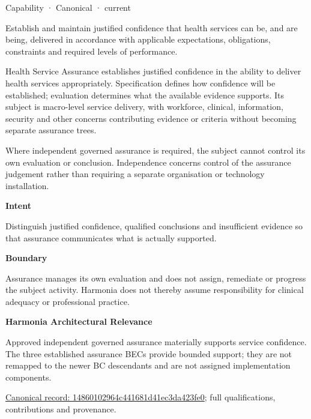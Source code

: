 \label{element:14860102964c441681d41ec3da423fe0}
{\small Capability · Canonical · current}\par

Establish and maintain justified confidence that health services can be, and are being, delivered in accordance with applicable expectations, obligations, constraints and required levels of performance.



Health Service Assurance establishes justified confidence in the ability to deliver health services appropriately. Specification defines how confidence will be established; evaluation determines what the available evidence supports. Its subject is macro-level service delivery, with workforce, clinical, information, security and other concerns contributing evidence or criteria without becoming separate assurance trees.



Where independent governed assurance is required, the subject cannot control its own evaluation or conclusion. Independence concerns control of the assurance judgement rather than requiring a separate organisation or technology installation.



\textbf{Intent}



Distinguish justified confidence, qualified conclusions and insufficient evidence so that assurance communicates what is actually supported.



\textbf{Boundary}



Assurance manages its own evaluation and does not assign, remediate or progress the subject activity. Harmonia does not thereby assume responsibility for clinical adequacy or professional practice.



\textbf{Harmonia Architectural Relevance}



Approved independent governed assurance materially supports service confidence. The three established assurance BECs provide bounded support; they are not remapped to the newer BC descendants and are not assigned implementation components.


{\footnotesize \href{../../../../continuum/strategy/capability/14860102964c441681d41ec3da423fe0.md}{Canonical record: 14860102964c441681d41ec3da423fe0}; full qualifications, contributions and provenance.}\par
